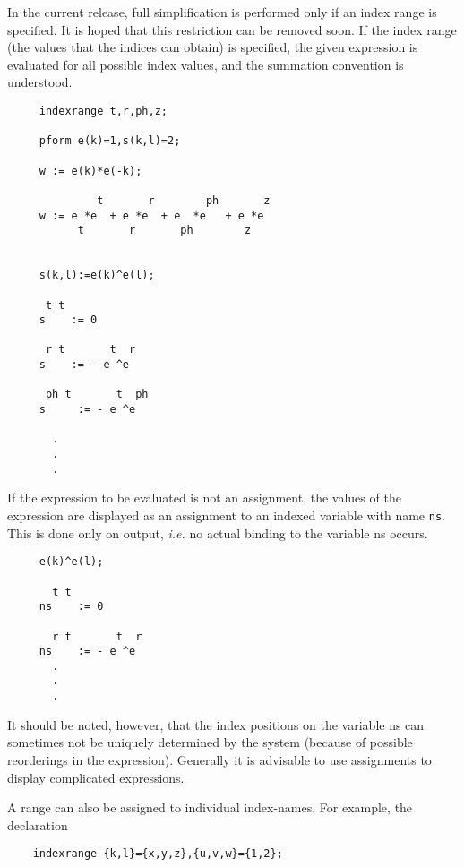 In the current release, full simplification is performed only if an
index range is specified.  It is hoped that this restriction can be
removed soon.  If the index range (the values that the indices can
obtain) is specified, the given expression is evaluated for all
possible index values, and the summation convention is understood.

\example\label{INDEXRANGE}
\hypertarget{command:INDEXRANGE}{}

\begin{verbatim}
     indexrange t,r,ph,z;

     pform e(k)=1,s(k,l)=2;

     w := e(k)*e(-k);

              t       r        ph       z
     w := e *e  + e *e  + e  *e   + e *e
           t       r       ph        z


     s(k,l):=e(k)^e(l);

      t t
     s    := 0

      r t       t  r
     s    := - e ^e

      ph t       t  ph
     s     := - e ^e

       .
       .
       .

\end{verbatim}

If the expression to be evaluated is not an assignment, the values of
the expression are displayed as an assignment to an indexed variable
with name \texttt{ns}.  This is done only on output, \emph{i.e.} no actual
binding to the variable ns occurs.

\begin{verbatim}
     e(k)^e(l);

       t t
     ns    := 0

       r t       t  r
     ns    := - e ^e
       .
       .
       .
\end{verbatim}

It should be noted, however, that the index positions on the variable
ns can sometimes not be uniquely determined by the system (because of
possible reorderings in the expression). Generally it is advisable to
use assignments to display complicated expressions.

A range can also be assigned to individual index-names. For example,
the declaration

\begin{verbatim}
    indexrange {k,l}={x,y,z},{u,v,w}={1,2};
\end{verbatim}

